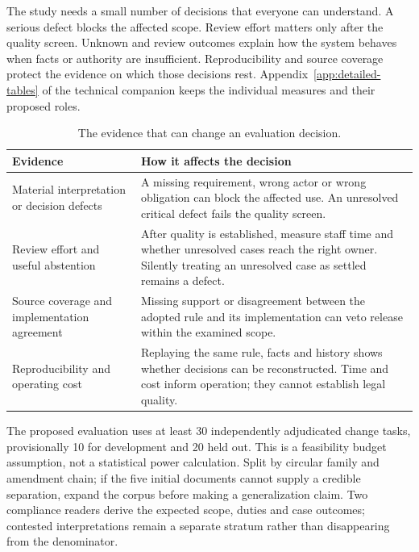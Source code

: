 
The study needs a small number of decisions that everyone can understand. A
serious defect blocks the affected scope. Review effort matters only after the
quality screen. Unknown and review outcomes explain how the system behaves when
facts or authority are insufficient. Reproducibility and source coverage protect
the evidence on which those decisions rest. Appendix~\ref{app:detailed-tables} of the technical companion
keeps the individual measures and their proposed roles.

\begin{table}[H]
\centering
\caption{The evidence that can change an evaluation decision.}
\label{tab:evaluation}
\begin{tabularx}{\textwidth}{P{48mm}Y}
\toprule
Evidence & How it affects the decision\\
\midrule
Material interpretation or decision defects & A missing requirement, wrong actor or wrong obligation can block the affected use. An unresolved critical defect fails the quality screen.\\
\addlinespace[0.5em]
Review effort and useful abstention & After quality is established, measure staff time and whether unresolved cases reach the right owner. Silently treating an unresolved case as settled remains a defect.\\
\addlinespace[0.5em]
Source coverage and implementation agreement & Missing support or disagreement between the adopted rule and its implementation can veto release within the examined scope.\\
\addlinespace[0.5em]
Reproducibility and operating cost & Replaying the same rule, facts and history shows whether decisions can be reconstructed. Time and cost inform operation; they cannot establish legal quality.\\
\bottomrule
\end{tabularx}
\end{table}

The proposed evaluation uses at least 30 independently adjudicated change tasks, provisionally
10 for development and 20 held out. This is a feasibility budget assumption,
not a statistical power calculation. Split by circular family and amendment
chain; if the five initial documents cannot supply a credible separation, expand
the corpus before making a generalization claim. Two compliance readers derive
the expected scope, duties and case outcomes; contested interpretations remain
a separate stratum rather than disappearing from the denominator.

